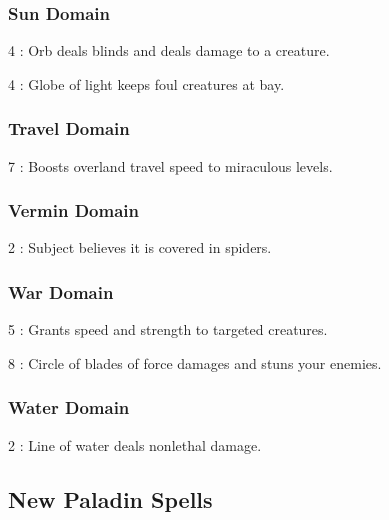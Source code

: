 \subsubsection{Sun Domain}
\begin{list}{}{\leftmargin=1em}
 \item[4] : Orb deals blinds and deals damage to a creature.
 \item[4] : Globe of light keeps foul creatures at bay.
\end{list}
\subsubsection{Travel Domain}
\begin{list}{}{\leftmargin=1em}
 \item[7] : Boosts overland travel speed to miraculous levels.
\end{list}
\subsubsection{Vermin Domain}
\begin{list}{}{\leftmargin=1em}
 \item[2] : Subject believes it is covered in spiders.
\end{list}
\subsubsection{War Domain}
\begin{list}{}{\leftmargin=1em}
 \item[5] : Grants speed and strength to targeted creatures.
 \item[8] : Circle of blades of force damages and stuns your enemies.
\end{list}
\subsubsection{Water Domain}
\begin{list}{}{\leftmargin=1em}
 \item[2] : Line of water deals nonlethal damage.
\end{list}


\subsection{New Paladin Spells}
